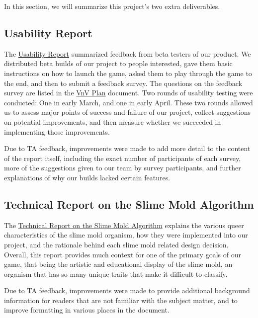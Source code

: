 \documentclass{article}
\begin{document}
In this section, we will summarize this project's two extra deliverables.

\subsection{Usability Report} \label{UsabilityReport}

The 
\href{https://github.com/felix-hurst/Ad-Natura/blob/main/docs/Extras/UsabilityReport/UsabilityReport.pdf}{Usability Report}
summarized feedback from beta testers of our product. We distributed beta builds
of our project to people interested, gave them basic instructions on how to launch
the game, asked them to play through the game to the end, and then to submit a
feedback survey. The questions on the feedback survey are listed in the 
\href{https://github.com/felix-hurst/Ad-Natura/blob/main/docs/VnVPlan/VnVPlan.pdf}{VnV Plan}
document. Two rounds of usability testing were conducted: One in early March, and one 
in early April. These two rounds allowed us to assess major points of success and failure 
of our project, collect suggestions on potential improvements, and then measure whether
we succeeded in implementing those improvements.

Due to TA feedback, improvements were made to add more detail to the content of
the report itself, including the exact number of participants of each survey,
more of the suggestions given to our team by survey participants, and 
further explanations of why our builds lacked certain features.

\subsection{Technical Report on the Slime Mold Algorithm}

The 
\href{https://github.com/felix-hurst/Ad-Natura/blob/main/docs/Extras/TechnicalReportSMA/TechnicalReportSMA.pdf}{Technical Report on the Slime Mold Algorithm}
explains the various queer characteristics of the slime mold organism, how they 
were implemented into our project, and the rationale behind each slime mold related 
design decision. Overall, this report provides much context for one of the primary 
goals of our game, that being the artistic and educational display of the slime mold, 
an organism that has so many unique traits that make it difficult to classify.

Due to TA feedback, improvements were made to provide additional background information 
for readers that are not familiar with the subject matter, and to improve formatting in 
various places in the document.
\end{document}

